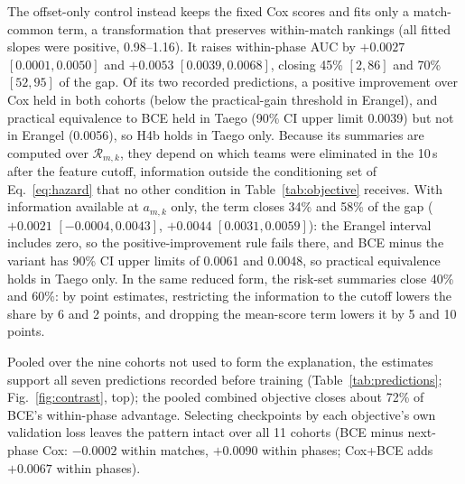\documentclass[sigconf,anonymous,nonacm]{acmart}
\begin{document}
The offset-only control instead keeps the fixed Cox scores and fits only a match-common term, a transformation that preserves within-match rankings (all fitted slopes were positive, 0.98--1.16). It raises within-phase AUC by $+0.0027$ $[0.0001,\allowbreak 0.0050]$ and $+0.0053$ $[0.0039,\allowbreak 0.0068]$, closing 45\% $[2,\allowbreak 86]$ and 70\% $[52,\allowbreak 95]$ of the gap. Of its two recorded predictions, a positive improvement over Cox held in both cohorts (below the practical-gain threshold in Erangel), and practical equivalence to BCE held in Taego (90\% CI upper limit 0.0039) but not in Erangel (0.0056), so H4b holds in Taego only. Because its summaries are computed over $\mathcal{R}_{m,k}$, they depend on which teams were eliminated in the 10\,s after the feature cutoff, information outside the conditioning set of Eq.~\eqref{eq:hazard} that no other condition in Table~\ref{tab:objective} receives. With information available at $a_{m,k}$ only, the term closes 34\% and 58\% of the gap ($+0.0021$ $[-0.0004,\allowbreak 0.0043]$, $+0.0044$ $[0.0031,\allowbreak 0.0059]$): the Erangel interval includes zero, so the positive-improvement rule fails there, and BCE minus the variant has 90\% CI upper limits of 0.0061 and 0.0048, so practical equivalence holds in Taego only. In the same reduced form, the risk-set summaries close 40\% and 60\%: by point estimates, restricting the information to the cutoff lowers the share by 6 and 2 points, and dropping the mean-score term lowers it by 5 and 10 points.


Pooled over the nine cohorts not used to form the explanation, the estimates support all seven predictions recorded before training (Table~\ref{tab:predictions}; Fig.~\ref{fig:contrast}, top); the pooled combined objective closes about 72\% of BCE's within-phase advantage. Selecting checkpoints by each objective's own validation loss leaves the pattern intact over all 11 cohorts (BCE minus next-phase Cox: $-0.0002$ within matches, $+0.0090$ within phases; Cox+BCE adds $+0.0067$ within phases).
\end{document}
